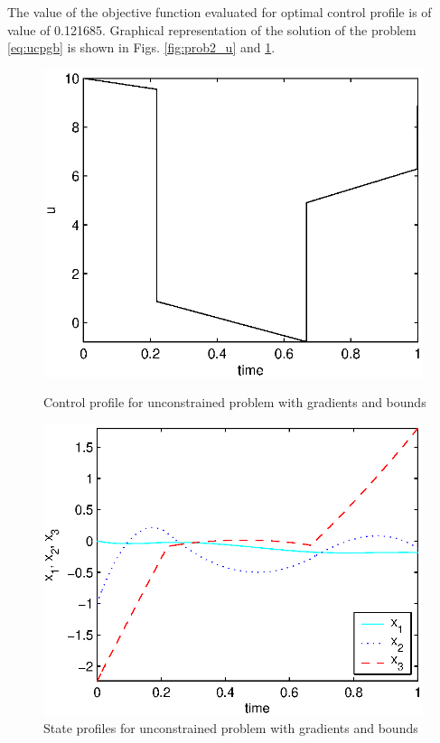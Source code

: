 The value of the objective function evaluated for optimal control
profile is of value of 0.121685. Graphical representation of the
solution of the problem \eqref{eq:ucpgb} is shown in
Figs. \ref{fig:prob2_u} and \ref{fig:prob2_x}. 

\begin{figure}[htb]
\begin{minipage}[t]{0.5\linewidth}
\centering
\includegraphics[width=0.99\textwidth]{examples/problem2/graphs/u_624a.eps}
\caption[Tutorial example 3: control profile]{Control profile for
  unconstrained problem with gradients and bounds} \label{fig:prob2_u} 
\end{minipage}
\begin{minipage}[t]{0.5\linewidth}
\centering
\includegraphics[width=0.99\textwidth]{examples/problem2/graphs/x13_624a.eps}
\caption[Tutorial example 3: state profiles]{State profiles for
  unconstrained problem with gradients and bounds} \label{fig:prob2_x}
\end{minipage}
\end{figure}

